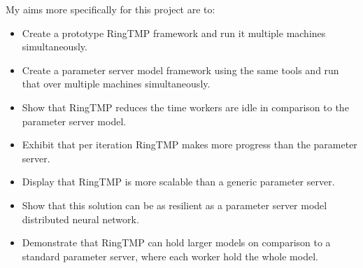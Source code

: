 My aims more specifically for this project are to:
\begin{itemize}
    \item Create a prototype RingTMP framework and run it multiple machines
    simultaneously.
    \item Create a parameter server model framework using the same tools and run
    that over multiple machines simultaneously.
    \item Show that RingTMP reduces the time workers are idle in comparison to
    the parameter server model.
    \item Exhibit that per iteration RingTMP makes more progress than the parameter
    server.
    \item Display that RingTMP is more scalable than a generic parameter server.
    \item Show that this solution can be as resilient as a parameter server
    model distributed neural network.
    \item Demonstrate that RingTMP can hold larger models on comparison to a
    standard parameter server, where each worker hold the whole model.
\end{itemize}




